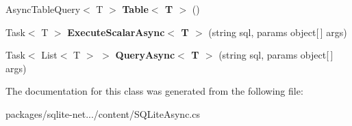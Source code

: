 \begin{DoxyCompactItemize}
\item 
\hypertarget{classSQLite_1_1SQLiteAsyncConnection_ae222dcdcc5033294c43c9cef1b16fbe1}{Async\-Table\-Query$<$ T $>$ {\bfseries Table$<$ T $>$} ()}\label{classSQLite_1_1SQLiteAsyncConnection_ae222dcdcc5033294c43c9cef1b16fbe1}

\item 
\hypertarget{classSQLite_1_1SQLiteAsyncConnection_adae67f753b244b754cc33be48cafbf67}{Task$<$ T $>$ {\bfseries Execute\-Scalar\-Async$<$ T $>$} (string sql, params object\mbox{[}$\,$\mbox{]} args)}\label{classSQLite_1_1SQLiteAsyncConnection_adae67f753b244b754cc33be48cafbf67}

\item 
\hypertarget{classSQLite_1_1SQLiteAsyncConnection_a8a81a54a5769d761562d9a3ce18b0f57}{Task$<$ List$<$ T $>$ $>$ {\bfseries Query\-Async$<$ T $>$} (string sql, params object\mbox{[}$\,$\mbox{]} args)}\label{classSQLite_1_1SQLiteAsyncConnection_a8a81a54a5769d761562d9a3ce18b0f57}

\end{DoxyCompactItemize}


The documentation for this class was generated from the following file\-:\begin{DoxyCompactItemize}
\item 
packages/sqlite-\/net.../content/S\-Q\-Lite\-Async.\-cs\end{DoxyCompactItemize}
